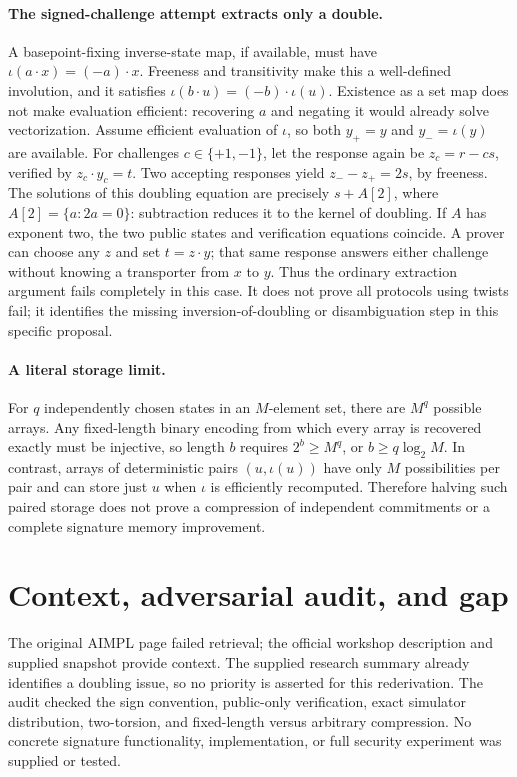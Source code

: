 \documentclass[11pt]{article}
\begin{document}
\paragraph{The signed-challenge attempt extracts only a double.}
A basepoint-fixing inverse-state map, if available, must have
$\iota(a\cdot x)=(-a)\cdot x$. Freeness and transitivity make this a
well-defined involution, and it satisfies
$\iota(b\cdot u)=(-b)\cdot\iota(u)$. Existence as a set map does not
make evaluation efficient: recovering $a$ and negating it would already
solve vectorization.
Assume efficient evaluation of $\iota$, so both $y_+=y$ and
$y_-=\iota(y)$ are available. For challenges $c\in\{+1,-1\}$, let the
response again be $z_c=r-cs$, verified by $z_c\cdot y_c=t$.
Two accepting responses yield
$z_- - z_+=2s$, by freeness. The solutions of this doubling equation are
precisely $s+A[2]$, where $A[2]=\{a:2a=0\}$: subtraction reduces it to
the kernel of doubling. If $A$ has exponent two, the two public states and
verification equations coincide. A prover can choose any $z$ and set
$t=z\cdot y$; that same response answers either challenge without knowing
a transporter from $x$ to $y$. Thus the ordinary extraction argument fails
completely in this case. It does not prove all protocols using twists fail;
it identifies the missing inversion-of-doubling or disambiguation step in
this specific proposal.

\paragraph{A literal storage limit.}
For $q$ independently chosen states in an $M$-element set, there are $M^q$
possible arrays. Any fixed-length binary encoding from which every array is
recovered exactly must be injective, so length $b$ requires
$2^b\ge M^q$, or $b\ge q\log_2 M$.
In contrast, arrays of deterministic pairs $(u,\iota(u))$ have only $M$
possibilities per pair and can store just $u$ when $\iota$ is efficiently
recomputed. Therefore halving such paired storage does not prove a compression
of independent commitments or a complete signature memory improvement.

\section{Context, adversarial audit, and gap}
The original AIMPL page failed retrieval; the official workshop description
and supplied snapshot provide context. The supplied research summary already
identifies a doubling issue, so no priority is asserted for this rederivation.
The audit checked the sign convention, public-only verification, exact
simulator distribution, two-torsion, and fixed-length versus arbitrary
compression. No concrete signature functionality, implementation, or full
security experiment was supplied or tested.
\end{document}
